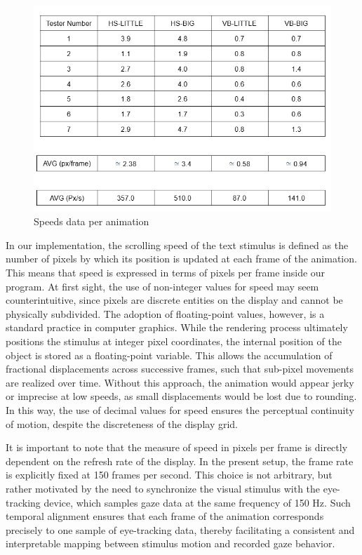 \documentclass{article}
\begin{document}
\begin{figure}[ht]
    \centering
    \includegraphics[width = 0.6
    \textwidth]{Images/Experiment/speeds.png}
    \caption{Speeds data per animation}
    \label{fig:sped}
\end{figure}

In our implementation, the scrolling speed of the text stimulus is defined as the number of pixels by which its position is updated at each frame of the animation.
This means that speed is expressed in terms of pixels per frame inside our program. 
At first sight, the use of non-integer values for speed may seem counterintuitive, since pixels are discrete entities on the display and cannot be physically subdivided. 
The adoption of floating-point values, however, is a standard practice in computer graphics. 
While the rendering process ultimately positions the stimulus at integer pixel coordinates, the internal position of the object is stored as a floating-point variable. 
This allows the accumulation of fractional displacements across successive frames, such that sub-pixel movements are realized over time. 
Without this approach, the animation would appear jerky or imprecise at low speeds, as small displacements would be lost due to rounding. 
In this way, the use of decimal values for speed ensures the perceptual continuity of motion, despite the discreteness of the display grid.

It is important to note that the measure of speed in pixels per frame is directly dependent on the refresh rate of the display. 
In the present setup, the frame rate is explicitly fixed at 150 frames per second. 
This choice is not arbitrary, but rather motivated by the need to synchronize the visual stimulus with the eye-tracking device, which samples gaze data at the same frequency of 150 Hz. 
Such temporal alignment ensures that each frame of the animation corresponds precisely to one sample of eye-tracking data, thereby facilitating a consistent and interpretable mapping between stimulus motion and recorded gaze behavior.
\end{document}
